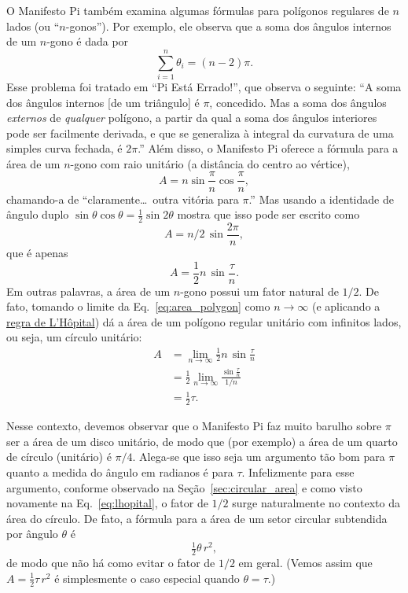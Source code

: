 {O Manifesto Pi também examina algumas fórmulas para polígonos regulares de $n$ lados (ou ``$n$-gonos''). Por exemplo, ele observa que a soma dos ângulos internos de um $n$-gono é dada por
\[
\sum_{i=1}^n \theta_i=(n-2)\pi.
\]
Esse problema foi tratado em ``Pi Está Errado!'', que observa o seguinte: ``A soma dos ângulos internos [de um triângulo] é $\pi$, concedido. Mas a soma dos ângulos \emph{externos} de \emph{qualquer} polígono, a partir da qual a soma dos ângulos interiores pode ser facilmente derivada, e que se generaliza à integral da curvatura de uma simples curva fechada, é $2\pi$.'' Além disso, o Manifesto Pi oferece a fórmula para a área de um $n$-gono com raio unitário (a distância do centro ao vértice),
\[ A=n\sin\frac{\pi}{n}\cos\frac{\pi}{n}, \]
chamando-a de ``claramente\ldots\ outra vitória para $\pi$.'' Mas usando a identidade de ângulo duplo $\sin\theta\cos\theta = \frac{1}{2} \sin 2\theta$ mostra que isso pode ser escrito como
\[ A = n/2\, \sin\frac{2\pi}{n}, \]
que é apenas
\begin{equation}
\label{eq:area_polygon}
A = \frac{1}{2} n\, \sin\frac{\tau}{n}.
\end{equation}
Em outras palavras, a área de um $n$-gono possui um fator natural de $1/2$. De fato, tomando o limite da Eq.~\eqref{eq:area_polygon} como $n\rightarrow \infty$ (e aplicando a \href{https://mathworld.wolfram.com/LHospitalsRule.html}{regra de L'H\^{o}pital}) dá a área de um polígono regular unitário com infinitos lados, ou seja, um círculo unitário:
\begin{equation}
\label{eq:lhopital}
\begin{split}
A & = \lim_{n\rightarrow\infty} \frac{1}{2} n\, \sin\frac{\tau}{n} \\
  & = \frac{1}{2} \lim_{n\rightarrow\infty} \frac{\sin\frac{\tau}{n}}{1/n} \\
  & = \tfrac{1}{2}\tau.
\end{split}
\end{equation}

Nesse contexto, devemos observar que o Manifesto Pi faz muito barulho sobre $\pi$ ser a área de um disco unitário, de modo que (por exemplo) a área de um quarto de círculo (unitário) é $\pi/4$. Alega-se que isso seja um argumento tão bom para $\pi$ quanto a medida do ângulo em radianos é para $\tau$. Infelizmente para esse argumento, conforme observado na Seção~\ref{sec:circular_area} e como visto novamente na Eq.~\eqref{eq:lhopital}, o fator de $1/2$ surge naturalmente no contexto da área do círculo. De fato, a fórmula para a área de um setor circular subtendida por ângulo $\theta$ é
\[
\tfrac{1}{2}\theta\, r^2,
\]
de modo que não há como evitar o fator de $1/2$ em geral. (Vemos assim que $A = \frac{1}{2} \tau\, r^2$ é simplesmente o caso especial quando $\theta = \tau$.)

}

